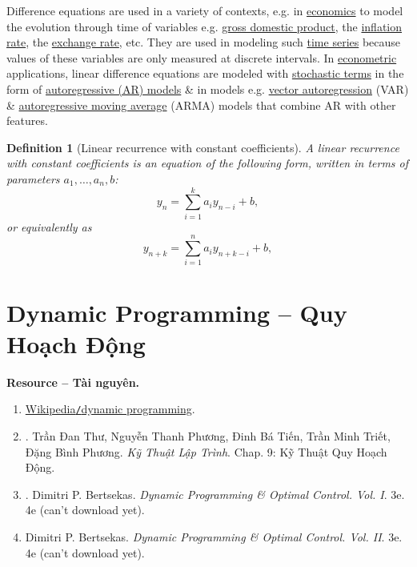 \documentclass{article}
\newtheorem{definition}{Definition}
\begin{document}
Difference equations are used in a variety of contexts, e.g. in \href{https://en.wikipedia.org/wiki/Economics}{economics} to model the evolution through time of variables e.g. \href{https://en.wikipedia.org/wiki/Gross_domestic_product}{gross domestic product}, the \href{https://en.wikipedia.org/wiki/Inflation_rate}{inflation rate}, the \href{https://en.wikipedia.org/wiki/Exchange_rate}{exchange rate}, etc. They are used in modeling such \href{https://en.wikipedia.org/wiki/Time_series}{time series} because values of these variables are only measured at discrete intervals. In \href{https://en.wikipedia.org/wiki/Econometrics}{econometric} applications, linear difference equations are modeled with \href{https://en.wikipedia.org/wiki/Stochastic_process}{stochastic terms} in the form of \href{https://en.wikipedia.org/wiki/Autoregressive_model}{autoregressive (AR) models} \& in models e.g. \href{https://en.wikipedia.org/wiki/Vector_autoregression}{vector autoregression} (VAR) \& \href{https://en.wikipedia.org/wiki/Autoregressive_moving_average}{autoregressive moving average} (ARMA) models that combine AR with other features.

\begin{definition}[Linear recurrence with constant coefficients]
	A {\rm linear recurrence with constant coefficients} is an equation of the following form, written in terms of parameters $a_1,\ldots,a_n,b$:
	\begin{equation}
		\label{linear recurrence with constant coefficients}
		y_n = \sum_{i=1}^k a_iy_{n-i} + b,
	\end{equation}
	or equivalently as
	\begin{equation}
		\label{linear recurrence with constant coefficients 1}
		y_{n + k} = \sum_{i=1}^n a_iy_{n + k - i} + b,
	\end{equation}
\end{definition}


\section{Dynamic Programming -- Quy Hoạch Động}
\textbf{\textsf{Resource -- Tài nguyên.}}
\begin{enumerate}
	\item \href{https://en.wikipedia.org/wiki/Dynamic_programming}{Wikipedia{\tt/}dynamic programming}.
	\item \cite{Thu_Phuong_Tien_Triet_Phuong_KTLT}. {\sc Trần Đan Thư, Nguyễn Thanh Phương, Đinh Bá Tiến, Trần Minh Triết, Đặng Bình Phương}. {\it Kỹ Thuật Lập Trình}. Chap. 9: Kỹ Thuật Quy Hoạch Động.
	\item \cite{Bertsekas2005,Bertsekas2017}. {\sc Dimitri P. Bertsekas}. {\it Dynamic Programming \& Optimal Control. Vol. I}. 3e. 4e (can't download yet).
	\item \cite{Bertsekas2007,Bertsekas2012} {\sc Dimitri P. Bertsekas}. {\it Dynamic Programming \& Optimal Control. Vol. II}. 3e. 4e (can't download yet).
\end{enumerate}
\end{document}
